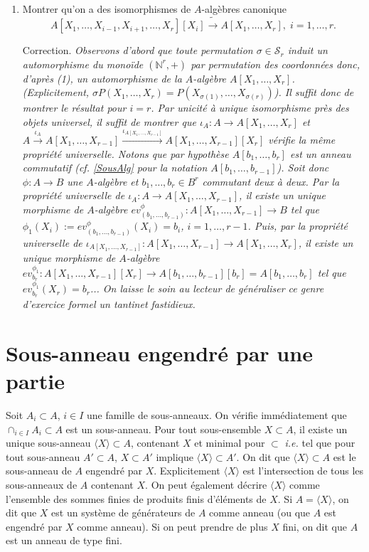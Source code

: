\documentclass[a4paper, oneside, 12pt]{book}
\theoremstyle{theoremeStyle} %
\theoremstyle{definition} %
\newcommand{\ie}{\textit{i.e.}} %
\newcommand{\N}{\mathbb{N}}
\begin{document}
\begin{enumerate}[leftmargin=* ,parsep=0cm,itemsep=0cm,topsep=0cm]
\item Montrer qu'on a des isomorphismes de $A$-algèbres canonique $$  A[X_1,\dots,X_{i-1},X_{i+1},\dots, X_r][X_i]\tilde{\rightarrow} A[X_1,\dots,X_r],\; i=1,\dots, r.$$

   Correction. \textit{Observons d'abord que toute permutation $\sigma\in \mathcal{S}_r$ induit un automorphisme du monoïde $(\N^r,+)$ par permutation des coordonnées donc, d'après (1), un automorphisme de la $A$-algèbre $A[X_1,\dots, X_r]$. (Explicitement, $\sigma P(X_1,\dots, X_r)=P(X_{\sigma(1)},\dots, X_{\sigma(r)})$). Il suffit donc de montrer le résultat pour $i=r$. Par unicité  à unique isomorphisme près des objets universel, il suffit de montrer que
$\iota_A:A\rightarrow A[X_1,\dots, X_r]$ et $A\stackrel{\iota_A}{\rightarrow} A[X_1,\dots, X_{r-1}]\stackrel{\iota_{A[X_1,\dots, X_{r-1}]}}{\rightarrow} A[X_1,\dots, X_{r-1}][X_r]$ vérifie la même propriété universelle. Notons que par hypothèse  $A[b_1,\dots ,b_r]$ est un anneau commutatif (\textit{cf.} \ref{SousAlg} pour la notation $A[b_1,\dots, b_{r-1}]$). Soit donc $\phi:A\rightarrow B$ une $A$-algèbre et $b_1,\dots, b_r\in B^r$ commutant deux à deux. Par la propriété universelle de $\iota_A:A\rightarrow A[X_1,\dots, X_{r-1}]$, il existe un unique morphisme de $A$-algèbre $ev_{(b_1,\dots, b_{r-1})}^\phi:A[X_1,\dots,X_{r-1}]\rightarrow B$ tel que $\phi_1(X_i):=ev_{(b_1,\dots, b_{r-1})}^\phi(X_i)=b_i$, $i=1,\dots, r-1$. Puis, par la propriété universelle de $\iota_{A[X_1,\dots, X_{r-1}]}:A[X_1,\dots, X_{r-1}]\rightarrow A[X_1,\dots, X_r]$, il existe un unique morphisme de $A$-algèbre $ev_{b_r}^{\phi_1}:A[X_1,\dots,X_{r-1}][X_r]\rightarrow A[b_1,\dots ,b_{r-1}][b_r]=A[b_1,\dots,b_r]$ tel que $ev_{b_r}^{\phi_1}(X_r)=b_r$... On laisse le soin au lecteur de généraliser ce genre d'exercice formel un tantinet fastidieux.} \\

  \end{enumerate}




  \section{Sous-anneau engendré par une partie} Soit  $A_i\subset A$, $i\in I$ une famille de sous-anneaux. On vérifie immédiatement que $\cap_{i\in I}A_i\subset A$ est un sous-anneau. Pour tout sous-ensemble $X\subset A$, il existe
un unique sous-anneau $\langle X\rangle \subset A$, contenant $X$ et minimal pour $\subset$ \ie{} tel que pour  tout sous-anneau $A'\subset A$,   $X\subset A'$ implique  $\langle X\rangle\subset A'$. On dit que $\langle X\rangle\subset A$ est le sous-anneau de $A$ engendré par $X$.  Explicitement $\langle X\rangle$ est l'intersection de tous les sous-anneaux de $A$ contenant $X$. On peut également décrire $\langle X\rangle$ comme  l'ensemble des sommes finies de produits finis d'éléments de $X$. Si $A=\langle X\rangle$, on dit que $X$ est un système de générateurs de $A$ comme anneau (ou que $A$ est engendré par $X$ comme anneau). Si on peut prendre de plus $X$ fini, on dit que $A$ est un anneau de type fini.\\
\end{document}
